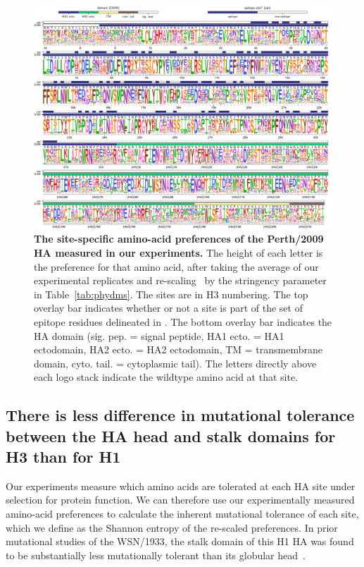 \documentclass[9pt,twocolumn,twoside]{pnas-new}
\begin{document}
\begin{figure}[ht]
\centering
\includegraphics[width=17cm]{figs/prefslogoplot/rescaled-avgprefs_prefs.pdf}
\caption{\label{fig:logoplot}
{\bf The site-specific amino-acid preferences of the Perth/2009 HA measured in our experiments.}
The height of each letter is the preference for that amino acid, after taking the average of our experimental replicates and re-scaling~\cite{hilton2017phydms} by the stringency parameter in Table~\ref{tab:phydms}.
The sites are in H3 numbering.
The top overlay bar indicates whether or not a site is part of the set of epitope residues delineated in \cite{wolf2006long}.
The bottom overlay bar indicates the HA domain (sig. pep. = signal peptide, HA1 ecto. = HA1 ectodomain, HA2 ecto. = HA2 ectodomain, TM = transmembrane domain, cyto. tail. = cytoplasmic tail).
The letters directly above each logo stack indicate the wildtype amino acid at that site.
}
\end{figure}

\subsection*{There is less difference in mutational tolerance between the HA head and stalk domains for H3 than for H1}
Our experiments measure which amino acids are tolerated at each HA site under selection for protein function.
We can therefore use our experimentally measured amino-acid preferences to calculate the inherent mutational tolerance of each site, which we define as the Shannon entropy of the re-scaled preferences.
In prior mutational studies of the WSN/1933, the stalk domain of this H1 HA was found to be substantially less mutationally tolerant than its globular head~\cite{thyagarajan2014inherent,wu2014high,doud2016accurate}.
\end{document}
